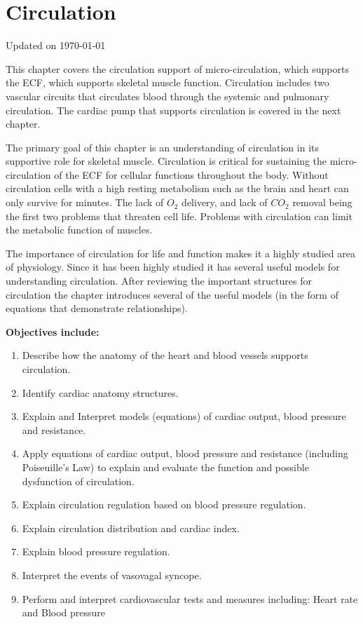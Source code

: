 
\chapter{Circulation}\label{chp:circulation}
Updated on \today
\minitoc


This chapter covers the circulation support of micro-circulation, which supports the ECF, which supports skeletal muscle function. Circulation includes two vascular circuits that circulates blood through the systemic and pulmonary circulation. The cardiac pump that supports circulation is covered in the next chapter.  

The primary goal of this chapter is an understanding of circulation in its supportive role for skeletal muscle. Circulation is critical for sustaining the micro-circulation of the ECF for cellular functions throughout the body. Without circulation cells with a high resting metabolism such as the brain and heart can only survive for minutes. The lack of $O_2$ delivery, and lack of $CO_2$ removal being the first two problems that threaten cell life. Problems with circulation can limit the metabolic function of muscles.   

The importance of circulation for life and function makes it a highly studied area of physiology. Since it has been highly studied it has several useful models for understanding circulation. After reviewing the important structures for circulation the chapter introduces several of the useful models (in the form of equations that demonstrate relationships).


\vspace{5mm}
\begin{svgraybox}
\textbf{Objectives include:}
\begin{enumerate}
    \item Describe how the anatomy of the heart and blood vessels supports circulation. 
    \item Identify cardiac anatomy structures.
    \item Explain and Interpret models (equations) of cardiac output, blood pressure and resistance.
    \item Apply equations of cardiac output, blood pressure and resistance (including Poiseuille's Law) to explain and evaluate the function and possible dysfunction of circulation.
    \item Explain circulation regulation based on blood pressure regulation.
    \item Explain circulation distribution and cardiac index.
    \item Explain blood pressure regulation.
    \item Interpret the events of vasovagal syncope.
    \item Perform and interpret cardiovascular tests and measures including: Heart rate and Blood pressure
\end{enumerate}
\end{svgraybox}

